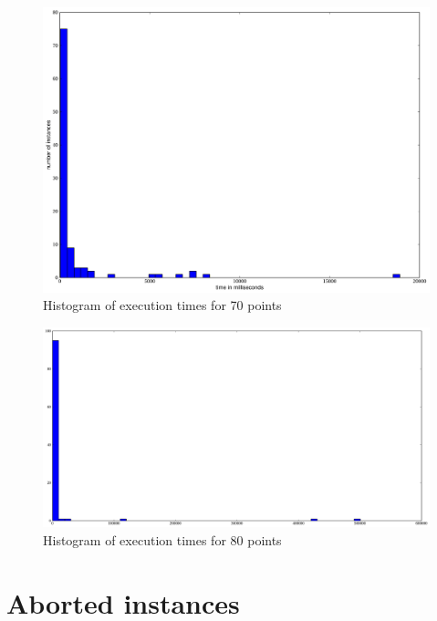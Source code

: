 \begin{figure}[ht]
  \centering
  \includegraphics[width=\linewidth,height=\textheight,keepaspectratio]{results/time_hist_70.pdf}
  \caption{\label{fig:times_70}Histogram of execution times for 70 points}
\end{figure}

\begin{figure}[ht]
  \centering
  \includegraphics[width=\linewidth,height=\textheight,keepaspectratio]{results/time_hist_80.pdf}
  \caption{\label{fig:times_80}Histogram of execution times for 80 points}
\end{figure}

\section{Aborted instances}

